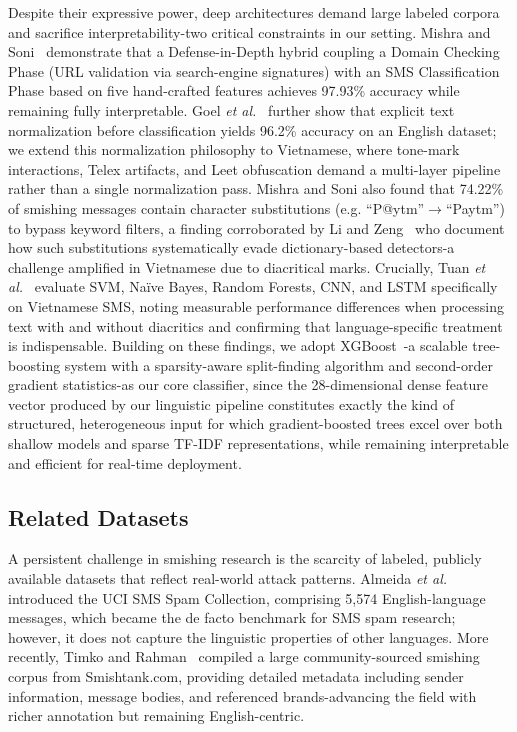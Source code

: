 \documentclass[conference]{IEEEtran}
\begin{document}
Despite their expressive power, deep architectures demand large labeled
corpora and sacrifice interpretability-two critical constraints in our
setting. Mishra and Soni~\cite{mishra2023dsmishsms} demonstrate that a
Defense-in-Depth hybrid coupling a Domain Checking Phase (URL validation via
search-engine signatures) with an SMS Classification Phase based on five
hand-crafted features achieves 97.93\% accuracy while remaining fully
interpretable. Goel \textit{et al.}~\cite{goel2024smishing} further show
that explicit text normalization before classification yields 96.2\% accuracy
on an English dataset; we extend this normalization philosophy to Vietnamese,
where tone-mark interactions, Telex artifacts, and Leet obfuscation demand a
multi-layer pipeline rather than a single normalization pass. Mishra and Soni
also found that 74.22\% of smishing messages contain character substitutions
(e.g. ``P@ytm''$\to$``Paytm'') to bypass keyword filters, a finding
corroborated by Li and Zeng~\cite{li2021leet} who document how such
substitutions systematically evade dictionary-based detectors-a challenge
amplified in Vietnamese due to diacritical marks. Crucially, Tuan
\textit{et al.}~\cite{tuan2023vietnamese} evaluate SVM, Naïve Bayes, Random
Forests, CNN, and LSTM specifically on Vietnamese SMS, noting measurable
performance differences when processing text with and without diacritics and
confirming that language-specific treatment is indispensable. Building on
these findings, we adopt XGBoost~\cite{chen2016xgboost}-a scalable
tree-boosting system with a sparsity-aware split-finding algorithm and
second-order gradient statistics-as our core classifier, since the
28-dimensional dense feature vector produced by our linguistic pipeline
constitutes exactly the kind of structured, heterogeneous input for which
gradient-boosted trees excel over both shallow models and sparse TF-IDF
representations, while remaining interpretable and efficient for real-time
deployment.

\subsection{Related Datasets}

A persistent challenge in smishing research is the scarcity of labeled,
publicly available datasets that reflect real-world attack patterns. Almeida
\textit{et al.}~\cite{almeida2011sms} introduced the UCI SMS Spam Collection,
comprising 5,574 English-language messages, which became the de facto
benchmark for SMS spam research; however, it does not capture the linguistic
properties of other languages. More recently, Timko and
Rahman~\cite{timko2024smishtank} compiled a large community-sourced smishing
corpus from Smishtank.com, providing detailed metadata including sender
information, message bodies, and referenced brands-advancing the field with
richer annotation but remaining English-centric.
\end{document}
